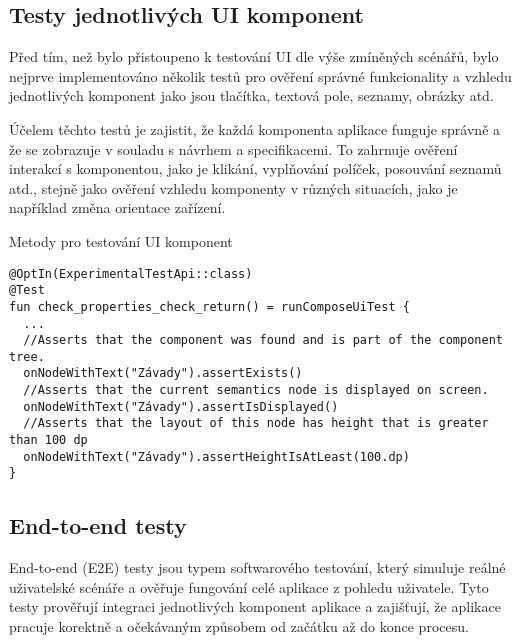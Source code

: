


\subsection{Testy jednotlivých UI komponent}
Před tím, než bylo přistoupeno k testování UI dle výše zmíněných scénářů, bylo nejprve implementováno několik testů pro ověření správné 
funkcionality a vzhledu jednotlivých komponent jako jsou tlačítka, textová pole, seznamy, obrázky atd.

Účelem těchto testů je zajistit, že každá komponenta aplikace funguje správně a že se zobrazuje v souladu s návrhem a specifikacemi. 
To zahrnuje ověření interakcí s komponentou, jako je klikání, vyplňování políček, posouvání seznamů atd., stejně jako ověření vzhledu komponenty v 
různých situacích, jako je například změna orientace zařízení.

\begin{listing}[H]
  \caption{Metody pro testování UI komponent}\label{lst:testImplementation}
  \begin{verbatim}
@OptIn(ExperimentalTestApi::class)
@Test
fun check_properties_check_return() = runComposeUiTest {
  ...
  //Asserts that the component was found and is part of the component tree.
  onNodeWithText("Závady").assertExists()
  //Asserts that the current semantics node is displayed on screen.
  onNodeWithText("Závady").assertIsDisplayed()
  //Asserts that the layout of this node has height that is greater than 100 dp
  onNodeWithText("Závady").assertHeightIsAtLeast(100.dp)
}
\end{verbatim}
\end{listing}

\subsection{End-to-end testy}
End-to-end (E2E) testy jsou typem softwarového testování, který simuluje reálné uživatelské scénáře a ověřuje fungování celé aplikace z pohledu uživatele.
Tyto testy prověřují integraci jednotlivých komponent aplikace a zajišťují, že aplikace pracuje korektně a očekávaným způsobem od začátku až do konce procesu.

